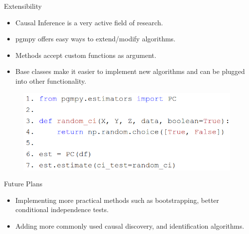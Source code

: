 \documentclass[aspectratio=169]{beamer}
\begin{document}
\begin{frame}{Extensibility}
	\begin{itemize}
		\item Causal Inference is a very active field of research.
		\item pgmpy offers easy ways to extend/modify algorithms.
		\item Methods accept custom functions as argument.
		\item Base classes make it easier to implement new algorithms and can be plugged into other functionality.
	\end{itemize}
	\vspace{1em}
	\begin{figure}
		\centering
		\includegraphics[scale=0.3]{imgs/extend.png}
	\end{figure}
\end{frame}

\begin{frame}{Future Plans}
	\begin{itemize}
		\item Implementing more practical methods such as bootstrapping, better conditional independence tests.
		\item Adding more commonly used causal discovery, and identification algorithms.
	\end{itemize}
\end{frame}

\end{document}
